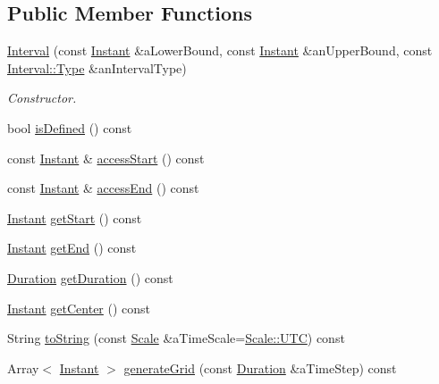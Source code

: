 \subsection*{Public Member Functions}
\begin{DoxyCompactItemize}
\item 
\hyperlink{classostk_1_1physics_1_1time_1_1_interval_a62d60b1eb3c7c782d7c45e8b9c153b34}{Interval} (const \hyperlink{classostk_1_1physics_1_1time_1_1_instant}{Instant} \&a\+Lower\+Bound, const \hyperlink{classostk_1_1physics_1_1time_1_1_instant}{Instant} \&an\+Upper\+Bound, const \hyperlink{classostk_1_1physics_1_1time_1_1_interval_a7011137ee6d84ebb8705c95d88f87818}{Interval\+::\+Type} \&an\+Interval\+Type)
\begin{DoxyCompactList}\small\item\em Constructor. \end{DoxyCompactList}\item 
bool \hyperlink{classostk_1_1physics_1_1time_1_1_interval_aa0ed88bea385d6afddaecc3423dd87d1}{is\+Defined} () const
\item 
const \hyperlink{classostk_1_1physics_1_1time_1_1_instant}{Instant} \& \hyperlink{classostk_1_1physics_1_1time_1_1_interval_abd9702e2a12cb6d6e3e4f51c210d0af1}{access\+Start} () const
\item 
const \hyperlink{classostk_1_1physics_1_1time_1_1_instant}{Instant} \& \hyperlink{classostk_1_1physics_1_1time_1_1_interval_a1a047369c0aac66fc28e0cb09870f1d2}{access\+End} () const
\item 
\hyperlink{classostk_1_1physics_1_1time_1_1_instant}{Instant} \hyperlink{classostk_1_1physics_1_1time_1_1_interval_ab3580768bc1def986b5e55659e7d6274}{get\+Start} () const
\item 
\hyperlink{classostk_1_1physics_1_1time_1_1_instant}{Instant} \hyperlink{classostk_1_1physics_1_1time_1_1_interval_a3a1fe4fdb656d7b38ddfcefac6c620ab}{get\+End} () const
\item 
\hyperlink{classostk_1_1physics_1_1time_1_1_duration}{Duration} \hyperlink{classostk_1_1physics_1_1time_1_1_interval_ae31a3fab2f4fa2f4881df6e62b8b3aeb}{get\+Duration} () const
\item 
\hyperlink{classostk_1_1physics_1_1time_1_1_instant}{Instant} \hyperlink{classostk_1_1physics_1_1time_1_1_interval_ab0abf8d0aaf5bb6181ddda58de5fe9a2}{get\+Center} () const
\item 
String \hyperlink{classostk_1_1physics_1_1time_1_1_interval_a23ff5318aa1847ac42dc347ef509fa5a}{to\+String} (const \hyperlink{namespaceostk_1_1physics_1_1time_adf23d37bd8641fb76a0e98ab46a70df7}{Scale} \&a\+Time\+Scale=\hyperlink{namespaceostk_1_1physics_1_1time_adf23d37bd8641fb76a0e98ab46a70df7a9234324ddf6b4176b57d803a925b7961}{Scale\+::\+U\+TC}) const
\item 
Array$<$ \hyperlink{classostk_1_1physics_1_1time_1_1_instant}{Instant} $>$ \hyperlink{classostk_1_1physics_1_1time_1_1_interval_ae50bd06e26fbee080424f7d202c6cdfc}{generate\+Grid} (const \hyperlink{classostk_1_1physics_1_1time_1_1_duration}{Duration} \&a\+Time\+Step) const
\end{DoxyCompactItemize}

